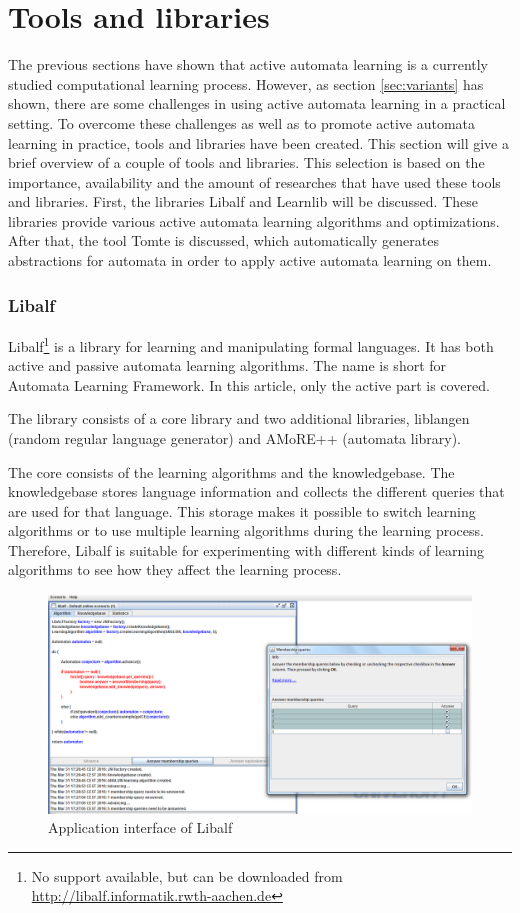 \documentclass[multi,crop=false,class=article]{standalone}
\begin{document}
\section{Tools and libraries}
\label{sec:tools}
The previous sections have shown that active automata learning is a currently 
studied computational learning process. However, as section 
\cref{sec:variants} has shown, there are some challenges in using active 
automata learning in a practical setting. To overcome these challenges as well 
as to promote active automata learning in practice, tools and libraries have 
been created. This section will give a brief overview of a couple of tools and 
libraries. This selection is based on the importance, availability and the 
amount of researches that have used these tools and libraries. First, the 
libraries Libalf and Learnlib will be discussed. These libraries provide 
various active automata learning algorithms and optimizations. After that, the 
tool Tomte is discussed, which automatically generates abstractions for 
automata in order to apply active automata learning on them. 


\subsubsection{Libalf}
\label{sssec:libalf}
Libalf\footnote{No support available, but can be downloaded from 
\url{http://libalf.informatik.rwth-aachen.de}} is a library for learning and 
manipulating formal languages. It has both active and passive automata learning 
algorithms. The name is short for Automata Learning Framework. In this article, 
only the active part is covered.

The library consists of a core library and two additional libraries, 
liblangen (random regular language generator) and AMoRE++ (automata library).

The core consists of the learning algorithms and the knowledgebase. The 
knowledgebase stores language information and collects the different queries 
that are used for that language. This storage makes it possible to switch 
learning algorithms or to use multiple learning algorithms during the learning 
process. Therefore, Libalf is suitable for experimenting with different kinds 
of learning algorithms to see how they affect the learning process. 

\begin{figure}[!ht]
	\includegraphics[width=\textwidth]{Tool_images/libalf_demo_interface.png}
	\caption{Application interface of Libalf}
	\label{fig:libalf_interface}
\end{figure}
\end{document}
